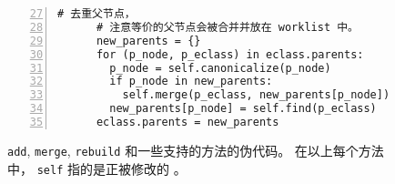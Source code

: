 \begin{figure}
\begin{minipage}[t]{0.47\linewidth}
\begin{lstlisting}[gobble=4, numbers=left, firstnumber=27, basicstyle=\scriptsize\ttfamily]
      # 去重父节点，
      # 注意等价的父节点会被合并并放在 worklist 中。
      new_parents = {}
      for (p_node, p_eclass) in eclass.parents:
        p_node = self.canonicalize(p_node)
        if p_node in new_parents:
          self.merge(p_eclass, new_parents[p_node])
        new_parents[p_node] = self.find(p_eclass)
      eclass.parents = new_parents
    \end{lstlisting}
  \end{minipage}
  \caption{
     \texttt{add}, \texttt{merge}, \texttt{rebuild} 和一些支持的方法的伪代码。
    在以上每个方法中， \texttt{self} 指的是正被修改的 \egraph 。
  }
  \label{fig:rebuild-code}
\end{figure}

